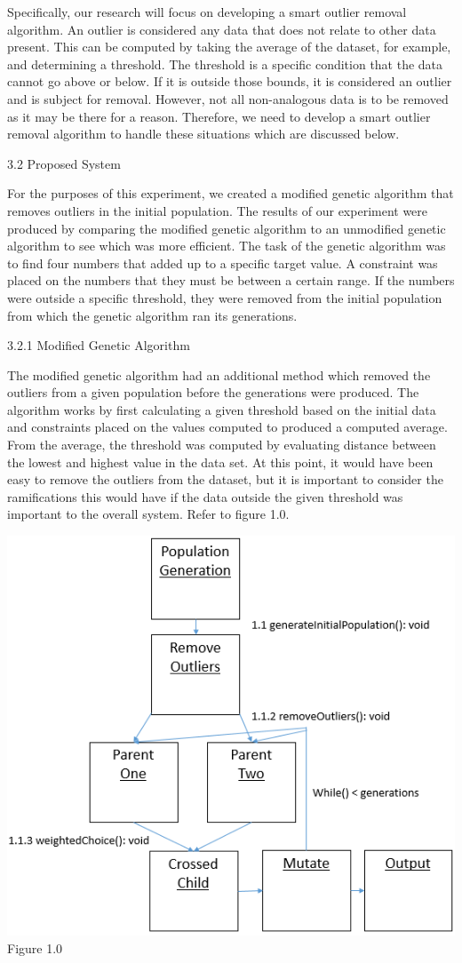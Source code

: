 \documentclass[conference]{IEEEtran}
\begin{document}
Specifically, our research will focus on developing a smart outlier removal algorithm. An outlier is considered any data that does not relate to other data present. This can be computed by taking the average of the dataset, for example, and determining a threshold. The threshold is a specific condition that the data cannot go above or below. If it is outside those bounds, it is considered an outlier and is subject for removal. However, not all non-analogous data is to be removed as it may be there for a reason. Therefore, we need to develop a smart outlier removal algorithm to handle these situations which are discussed below. 

3.2 Proposed System

For the purposes of this experiment, we created a modified genetic algorithm that removes outliers in the initial population. The results of our experiment were produced by comparing the modified genetic algorithm to an unmodified genetic algorithm to see which was more efficient. The task of the genetic algorithm was to find four numbers that added up to a specific target value. A constraint was placed on the numbers that they must be between a certain range. If the numbers were outside a specific threshold, they were removed from the initial population from which the genetic algorithm ran its generations. 

3.2.1 Modified Genetic Algorithm

The modified genetic algorithm had an additional method which removed the outliers from a given population before the generations were produced. The algorithm works by first calculating a given threshold based on the initial data and constraints placed on the values computed to produced a computed average. From the average, the threshold was computed by evaluating distance between the lowest and highest value in the data set. At this point, it would have been easy to remove the outliers from the dataset, but it is important to consider the ramifications this would have if the data outside the given threshold was important to the overall system. Refer to figure 1.0.

\includegraphics[scale=0.5]{Collab}
Figure 1.0
\end{document}
